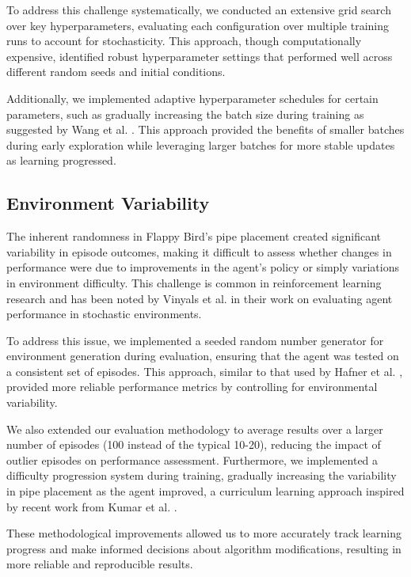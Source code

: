 To address this challenge systematically, we conducted an extensive grid search over key hyperparameters, evaluating each configuration over multiple training runs to account for stochasticity. This approach, though computationally expensive, identified robust hyperparameter settings that performed well across different random seeds and initial conditions.

Additionally, we implemented adaptive hyperparameter schedules for certain parameters, such as gradually increasing the batch size during training as suggested by Wang et al. \cite{wang2022offline}. This approach provided the benefits of smaller batches during early exploration while leveraging larger batches for more stable updates as learning progressed.

\subsection{Environment Variability}

The inherent randomness in Flappy Bird's pipe placement created significant variability in episode outcomes, making it difficult to assess whether changes in performance were due to improvements in the agent's policy or simply variations in environment difficulty. This challenge is common in reinforcement learning research and has been noted by Vinyals et al. \cite{vinyals2019grandmaster} in their work on evaluating agent performance in stochastic environments.

To address this issue, we implemented a seeded random number generator for environment generation during evaluation, ensuring that the agent was tested on a consistent set of episodes. This approach, similar to that used by Hafner et al. \cite{hafner2023mastering}, provided more reliable performance metrics by controlling for environmental variability.

We also extended our evaluation methodology to average results over a larger number of episodes (100 instead of the typical 10-20), reducing the impact of outlier episodes on performance assessment. Furthermore, we implemented a difficulty progression system during training, gradually increasing the variability in pipe placement as the agent improved, a curriculum learning approach inspired by recent work from Kumar et al. \cite{kumar2023offline}.

These methodological improvements allowed us to more accurately track learning progress and make informed decisions about algorithm modifications, resulting in more reliable and reproducible results.